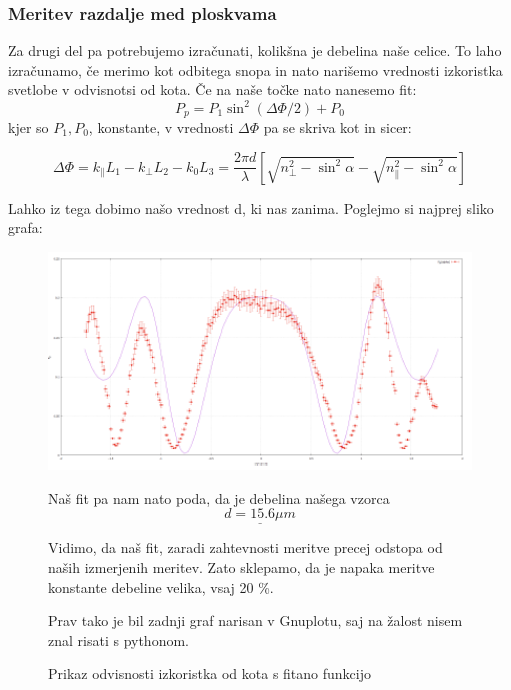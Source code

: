 \documentclass[11pt, a4paper]{article}
\theoremstyle{definition}
\theoremstyle{example}
\theoremstyle{izrek}
\begin{document}
\subsubsection{Meritev razdalje med ploskvama}
Za drugi del pa potrebujemo izračunati, kolikšna je debelina naše celice.
To laho izračunamo, če merimo kot odbitega snopa in nato narišemo vrednosti izkoristka svetlobe v odvisnotsi od kota. Če na naše točke nato nanesemo fit: 
$$P_{p}=P_{1} \sin ^{2}(\Delta \Phi / 2)+P_{0}$$
 kjer so $P_1, P_0$, konstante, v vrednosti $\Delta \Phi$ pa se skriva kot in sicer:
 
$$\Delta \Phi=k_{\|} L_{1}-k_{\perp} L_{2}-k_{0} L_{3}=\frac{2 \pi d}{\lambda}[\sqrt{n_{\perp}^{2}-\sin ^{2} \alpha}-\sqrt{n_{\|}^{2}-\sin ^{2} \alpha}]$$

Lahko iz tega dobimo našo vrednost d, ki nas zanima. Poglejmo si najprej sliko grafa: 
\begin{figure}[H]
	\centering
    \includegraphics[width=15cm]{Debelina.png}
    \caption{Prikaz odvisnosti izkoristka od kota s fitano funkcijo}
    
Naš fit pa nam nato poda, da je debelina našega vzorca 
$$\underline{d=15.6 \mu m}$$

Vidimo, da naš fit, zaradi zahtevnosti meritve precej odstopa od naših izmerjenih meritev. Zato sklepamo, da je napaka meritve konstante debeline velika, vsaj 20 \%.

Prav tako je bil zadnji graf narisan v Gnuplotu, saj na žalost nisem znal risati s pythonom.
\end{figure}
\end{document}
